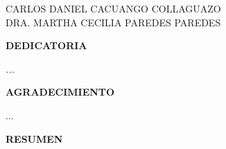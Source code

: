 \vspace{3.0cm}
\begin{flushleft}
    CARLOS DANIEL CACUANGO COLLAGUAZO\\[1 cm]
    DRA. MARTHA CECILIA PAREDES PAREDES
\end{flushleft}

\clearpage

\begin{center}
    {\fontsize{14}{17}\bfseries\sffamily DEDICATORIA}
\end{center}
\vspace{2.0cm}

\begin{flushright}
    \begin{minipage}{10cm}
        \itshape
        ...
    \end{minipage}
\end{flushright}

\clearpage

\begin{center}
    {\fontsize{14}{17}\bfseries\sffamily AGRADECIMIENTO}
\end{center}
\vspace{1.0cm}

\noindent ...

\clearpage

\tableofcontents
\clearpage

\listoffigures
\clearpage

\listoftables
\clearpage

\begin{center}
    {\fontsize{14}{17}\bfseries\sffamily RESUMEN}
\end{center}
\vspace{0.5cm}

